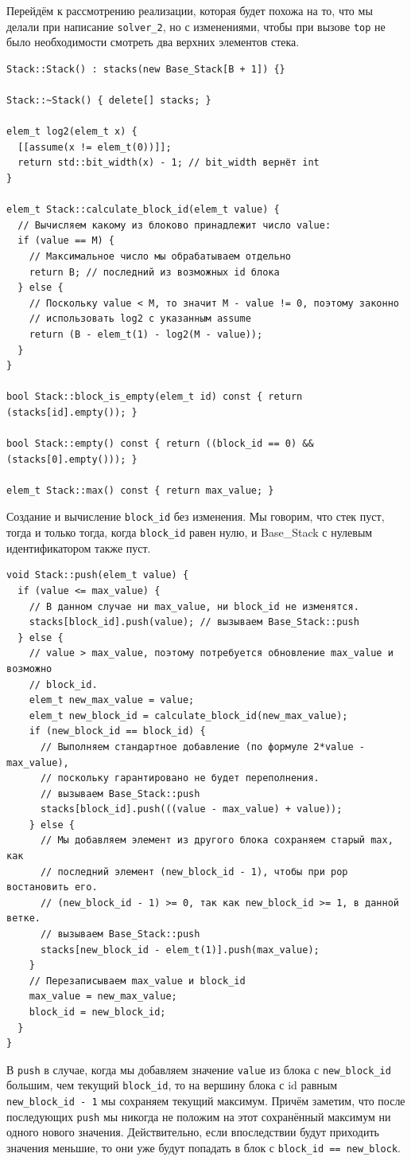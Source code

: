 Перейдём к рассмотрению реализации, которая будет похожа на то, что мы делали при написание \texttt{solver_2}, но с изменениями, чтобы при вызове \texttt{top} не было необходимости смотреть два верхних элементов стека.
\begin{verbatim}
Stack::Stack() : stacks(new Base_Stack[B + 1]) {}

Stack::~Stack() { delete[] stacks; }

elem_t log2(elem_t x) {
  [[assume(x != elem_t(0))]];
  return std::bit_width(x) - 1; // bit_width вернёт int
}

elem_t Stack::calculate_block_id(elem_t value) {
  // Вычисляем какому из блоково принадлежит число value:
  if (value == M) {
    // Максимальное число мы обрабатываем отдельно
    return B; // последний из возможных id блока
  } else {
    // Поскольку value < M, то значит M - value != 0, поэтому законно
    // использовать log2 с указанным assume
    return (B - elem_t(1) - log2(M - value));
  }
}

bool Stack::block_is_empty(elem_t id) const { return (stacks[id].empty()); }

bool Stack::empty() const { return ((block_id == 0) && (stacks[0].empty())); }

elem_t Stack::max() const { return max_value; }
\end{verbatim}
Создание и вычисление \texttt{block_id} без изменения. Мы говорим, что стек пуст, тогда и только тогда, когда \texttt{block_id} равен нулю, и Base_Stack с нулевым идентификатором также пуст.

\begin{verbatim}
void Stack::push(elem_t value) {
  if (value <= max_value) {
    // В данном случае ни max_value, ни block_id не изменятся.
    stacks[block_id].push(value); // вызываем Base_Stack::push
  } else {
    // value > max_value, поэтому потребуется обновление max_value и возможно
    // block_id.
    elem_t new_max_value = value;
    elem_t new_block_id = calculate_block_id(new_max_value);
    if (new_block_id == block_id) {
      // Выполняем стандартное добавление (по формуле 2*value - max_value),
      // поскольку гарантировано не будет переполнения.
      // вызываем Base_Stack::push
      stacks[block_id].push(((value - max_value) + value));
    } else {
      // Мы добавляем элемент из другого блока сохраняем старый max, как
      // последний элемент (new_block_id - 1), чтобы при pop востановить его.
      // (new_block_id - 1) >= 0, так как new_block_id >= 1, в данной ветке.
      // вызываем Base_Stack::push
      stacks[new_block_id - elem_t(1)].push(max_value);
    }
    // Перезаписываем max_value и block_id
    max_value = new_max_value;
    block_id = new_block_id;
  }
}
\end{verbatim}
В \texttt{push} в случае, когда мы добавляем значение \texttt{value} из блока с \texttt{new_block_id} большим, чем текущий \texttt{block_id}, то на вершину блока с id равным \texttt{new_block_id - 1} мы сохраняем текущий максимум. Причём заметим, что после последующих \texttt{push} мы никогда не положим на этот сохранённый максимум ни одного нового значения. Действительно, если впоследствии будут приходить значения меньшие, то они уже будут попадать в блок с \texttt{block_id == new_block}.

